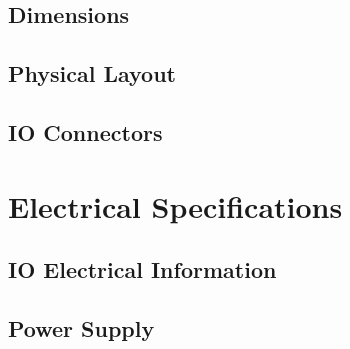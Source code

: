 \documentclass[letterpaper, 11pt, twoside]{article}
\begin{document}
\paragraph{}

\subsection{Dimensions}
\paragraph{}

\subsection{Physical Layout}
\paragraph{}

\subsection{IO Connectors}
\paragraph{}

\cleardoublepage
\section{Electrical Specifications}
\paragraph{}

\subsection{IO Electrical Information}
\paragraph{}

\subsection{Power Supply}
\end{document}
